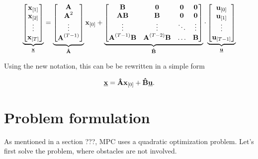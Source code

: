\documentclass{article}
\begin{document}
\begin{equation}
\label{eq:prediction_big}
\underbrace{
\begin{bmatrix}
\textbf{x}_{[1]} \\
\textbf{x}_{[2]} \\
\vdots \\
\textbf{x}_{[T]} \\
\end{bmatrix}}_{\textbf{\underline{x}}}
=
\underbrace{
\begin{bmatrix}
\textbf{A} \\
\textbf{A}^2 \\
\vdots \\
\textbf{A}^{(T-1)} \\
\end{bmatrix}}_{\textbf{\^A}}
\textbf{x}_{[0]}
+
\underbrace{
\begin{bmatrix}
\textbf{B} & \textbf{0} & \textbf{0} & \textbf{0} \\
\textbf{AB} & \textbf{B} & \textbf{0} & \textbf{0} \\
\vdots & \vdots & \ddots & \vdots \\
\textbf{A}^{(T-1)}\textbf{B} & \textbf{A}^{(T-2)}\textbf{B} & \hdots & \textbf{B}
\end{bmatrix}
}_{\textbf{\^B}}
\cdot
\underbrace{
\begin{bmatrix}
\textbf{u}_{[0]} \\
\textbf{u}_{[1]} \\
\vdots \\
\textbf{u}_{[T-1]} \\
\end{bmatrix}}_{\textbf{\underline{u}}}
\end{equation}

Using the new notation, this can be be rewritten in a simple form

\begin{equation}
\label{eq:prediction_final}
\textbf{\underline{x}} = \textbf{\^A}\textbf{x}_{[0]} + \textbf{\^B}\textbf{\underline{u}}.
\end{equation}

\section{Problem formulation}
As mentioned in a section ???, MPC uses a quadratic optimization problem. Let's first solve the problem, where obstacles are not involved. 
\end{document}
